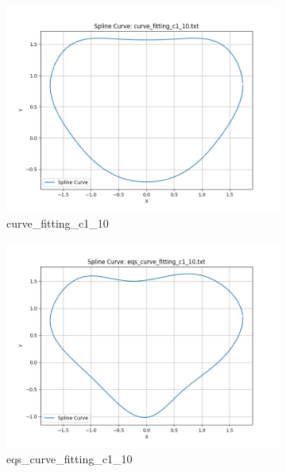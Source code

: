 \documentclass[a4paper]{article}
\begin{document}
\begin{figure}[htbp]
  \centering
  \begin{subfigure}[t]{0.24\textwidth}
      \centering
      \includegraphics[width=\textwidth]{figures/E/curve_fitting_c1_10.png}
      \caption*{curve\_fitting\_c1\_10}
  \end{subfigure}
  \begin{subfigure}[t]{0.24\textwidth}
      \centering
      \includegraphics[width=\textwidth]{figures/E/eqs_curve_fitting_c1_10.png}
      \caption*{eqs\_curve\_fitting\_c1\_10}
  \end{subfigure}
  \begin{subfigure}[t]{0.24\textwidth}
      \centering

\end{subfigure}
\end{figure}
\end{document}
